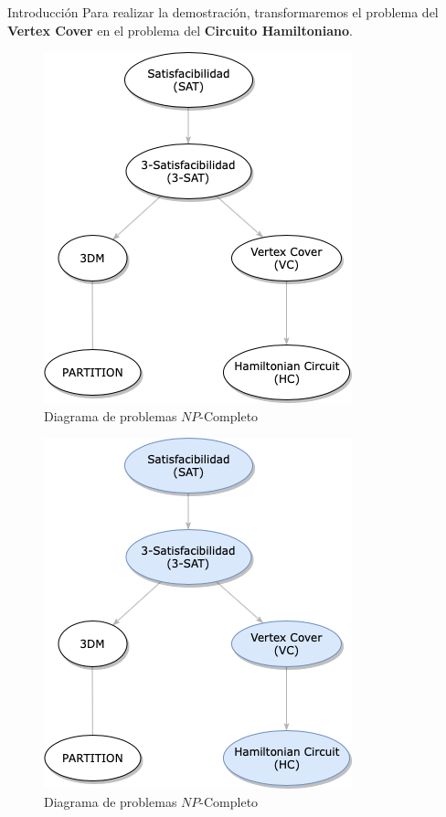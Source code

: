 \documentclass{beamer}
\begin{document}
\begin{frame}{Introducción}
    Para realizar la demostración, transformaremos el problema del \textbf{Vertex Cover} en el problema del \textbf{Circuito Hamiltoniano}.
     {
        \begin{figure}
            \centering
            \includegraphics[scale=0.4]{images/NP-Completo-1.png}
            \caption{Diagrama de problemas $NP$-Completo}
            \label{fig:my_label}
        \end{figure}
    }

     {
        \begin{figure}
            \centering
            \includegraphics[scale=0.4]{images/NP-Completo-2.png}
            \caption{Diagrama de problemas $NP$-Completo}
            \label{fig:my_label}
        \end{figure}
    }
\end{frame}
\end{document}
